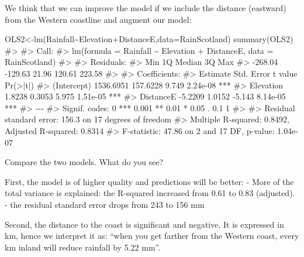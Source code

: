 \documentclass[
  letterpaper,
  DIV=11,
  numbers=noendperiod]{scrreprt}
\newenvironment{Shaded}{\begin{snugshade}}{\end{snugshade}}
\newcommand{\AttributeTok}[1]{\textcolor[rgb]{0.40,0.45,0.13}{#1}}
\newcommand{\CommentTok}[1]{\textcolor[rgb]{0.37,0.37,0.37}{#1}}
\newcommand{\FunctionTok}[1]{\textcolor[rgb]{0.28,0.35,0.67}{#1}}
\newcommand{\NormalTok}[1]{\textcolor[rgb]{0.00,0.23,0.31}{#1}}
\newcommand{\OtherTok}[1]{\textcolor[rgb]{0.00,0.23,0.31}{#1}}
\newcommand{\SpecialCharTok}[1]{\textcolor[rgb]{0.37,0.37,0.37}{#1}}
\begin{document}
We think that we can improve the model if we include the distance
(eastward) from the Western coastline and augment our model:

\begin{Shaded}
\begin{Highlighting}[]
\NormalTok{OLS2}\OtherTok{\textless{}{-}}\FunctionTok{lm}\NormalTok{(Rainfall}\SpecialCharTok{\textasciitilde{}}\NormalTok{Elevation}\SpecialCharTok{+}\NormalTok{DistanceE,}\AttributeTok{data=}\NormalTok{RainScotland)}
\FunctionTok{summary}\NormalTok{(OLS2)}
\CommentTok{\#\textgreater{} }
\CommentTok{\#\textgreater{} Call:}
\CommentTok{\#\textgreater{} lm(formula = Rainfall \textasciitilde{} Elevation + DistanceE, data = RainScotland)}
\CommentTok{\#\textgreater{} }
\CommentTok{\#\textgreater{} Residuals:}
\CommentTok{\#\textgreater{}     Min      1Q  Median      3Q     Max }
\CommentTok{\#\textgreater{} {-}268.04 {-}129.63   21.96  120.61  223.58 }
\CommentTok{\#\textgreater{} }
\CommentTok{\#\textgreater{} Coefficients:}
\CommentTok{\#\textgreater{}              Estimate Std. Error t value Pr(\textgreater{}|t|)    }
\CommentTok{\#\textgreater{} (Intercept) 1536.6951   157.6228   9.749 2.24e{-}08 ***}
\CommentTok{\#\textgreater{} Elevation      1.8238     0.3053   5.975 1.51e{-}05 ***}
\CommentTok{\#\textgreater{} DistanceE     {-}5.2209     1.0152  {-}5.143 8.14e{-}05 ***}
\CommentTok{\#\textgreater{} {-}{-}{-}}
\CommentTok{\#\textgreater{} Signif. codes:  0 \textquotesingle{}***\textquotesingle{} 0.001 \textquotesingle{}**\textquotesingle{} 0.01 \textquotesingle{}*\textquotesingle{} 0.05 \textquotesingle{}.\textquotesingle{} 0.1 \textquotesingle{} \textquotesingle{} 1}
\CommentTok{\#\textgreater{} }
\CommentTok{\#\textgreater{} Residual standard error: 156.3 on 17 degrees of freedom}
\CommentTok{\#\textgreater{} Multiple R{-}squared:  0.8492, Adjusted R{-}squared:  0.8314 }
\CommentTok{\#\textgreater{} F{-}statistic: 47.86 on 2 and 17 DF,  p{-}value: 1.04e{-}07}
\end{Highlighting}
\end{Shaded}

Compare the two models. What do you see?

First, the model is of higher quality and predictions will be better: -
More of the total variance is explained: the R-squared increased from
0.61 to 0.83 (adjusted). - the residual standard error drops from 243 to
156 mm

Second, the distance to the coast is significant and negative. It is
expressed in km, hence we interpret it as: ``when you get farther from
the Western coast, every km inland will reduce rainfall by 5.22 mm''.
\end{document}
